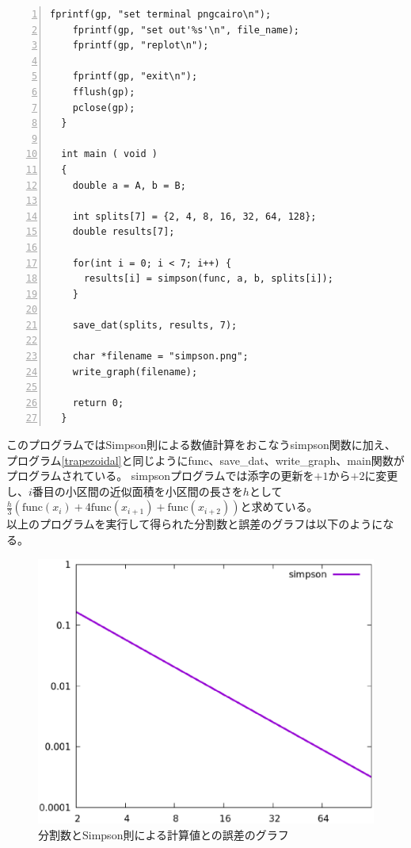 \documentclass[a4paper]{jsarticle}
\begin{document}
\begin{lstlisting}[caption={\texttt{Simpson則による数値計算とその誤差を求めるコード}}, numbers=left, label={Simpson1}]
    fprintf(gp, "set terminal pngcairo\n");
    fprintf(gp, "set out'%s'\n", file_name);
    fprintf(gp, "replot\n");

    fprintf(gp, "exit\n");
    fflush(gp);
    pclose(gp);
  }

  int main ( void )
  {
    double a = A, b = B;

    int splits[7] = {2, 4, 8, 16, 32, 64, 128};
    double results[7];

    for(int i = 0; i < 7; i++) {
      results[i] = simpson(func, a, b, splits[i]);
    }

    save_dat(splits, results, 7);

    char *filename = "simpson.png";
    write_graph(filename);

    return 0;
  }

\end{lstlisting}

このプログラムではSimpson則による数値計算をおこなうsimpson関数に加え、プログラム\ref{trapezoidal}と同じようにfunc、save\_dat、write\_graph、main関数がプログラムされている。
simpsonプログラムでは添字の更新を\(+1\)から\(+2\)に変更し、\(i\)番目の小区間の近似面積を小区間の長さを\(h\)として\(\frac{h}{3}(\text{func}(x_i) + 4\text{func}(x_{i+1}) + \text{func}(x_{i+2}))\)と求めている。 \\
\indent 以上のプログラムを実行して得られた分割数と誤差のグラフは以下のようになる。

\begin{figure}[H]
  \includegraphics[width=\textwidth]{pictures/simpson.eps}
  \caption{分割数とSimpson則による計算値との誤差のグラフ}
  \label{Simpson_graph_1}
\end{figure}
\end{document}
